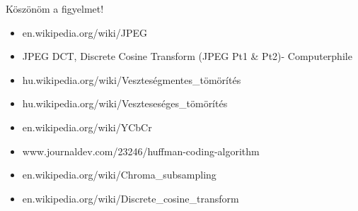 \documentclass{beamer}
\begin{document}
\begin{frame}
\centering
{\Huge Köszönöm a figyelmet!}
\end{frame}

\begin{footnotesize}
    \begin{itemize}
        \item en.wikipedia.org/wiki/JPEG
        \item JPEG DCT, Discrete Cosine Transform (JPEG Pt1 \& Pt2)- Computerphile
        \item hu.wikipedia.org/wiki/Veszteségmentes\_tömörítés
        \item hu.wikipedia.org/wiki/Veszteseséges\_tömörítés
        \item en.wikipedia.org/wiki/YCbCr
        \item www.journaldev.com/23246/huffman-coding-algorithm
        \item en.wikipedia.org/wiki/Chroma\_subsampling
        \item en.wikipedia.org/wiki/Discrete\_cosine\_transform
    \end{itemize}
\end{footnotesize}
\end{document}
